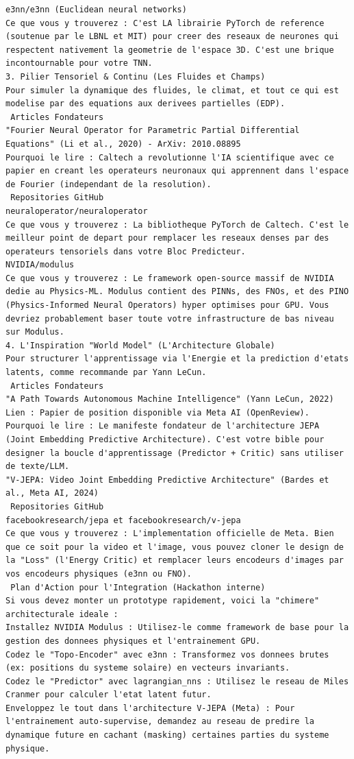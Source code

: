 \documentclass[11pt,a4paper]{article}
\begin{document}
\begin{lstlisting}[language={}, caption={}, basicstyle=\ttfamily\footnotesize, breaklines=true]
e3nn/e3nn (Euclidean neural networks)
Ce que vous y trouverez : C'est LA librairie PyTorch de reference (soutenue par le LBNL et MIT) pour creer des reseaux de neurones qui respectent nativement la geometrie de l'espace 3D. C'est une brique incontournable pour votre TNN.
3. Pilier Tensoriel & Continu (Les Fluides et Champs)
Pour simuler la dynamique des fluides, le climat, et tout ce qui est modelise par des equations aux derivees partielles (EDP).
 Articles Fondateurs
"Fourier Neural Operator for Parametric Partial Differential Equations" (Li et al., 2020) - ArXiv: 2010.08895
Pourquoi le lire : Caltech a revolutionne l'IA scientifique avec ce papier en creant les operateurs neuronaux qui apprennent dans l'espace de Fourier (independant de la resolution).
 Repositories GitHub
neuraloperator/neuraloperator
Ce que vous y trouverez : La bibliotheque PyTorch de Caltech. C'est le meilleur point de depart pour remplacer les reseaux denses par des operateurs tensoriels dans votre Bloc Predicteur.
NVIDIA/modulus
Ce que vous y trouverez : Le framework open-source massif de NVIDIA dedie au Physics-ML. Modulus contient des PINNs, des FNOs, et des PINO (Physics-Informed Neural Operators) hyper optimises pour GPU. Vous devriez probablement baser toute votre infrastructure de bas niveau sur Modulus.
4. L'Inspiration "World Model" (L'Architecture Globale)
Pour structurer l'apprentissage via l'Energie et la prediction d'etats latents, comme recommande par Yann LeCun.
 Articles Fondateurs
"A Path Towards Autonomous Machine Intelligence" (Yann LeCun, 2022)
Lien : Papier de position disponible via Meta AI (OpenReview).
Pourquoi le lire : Le manifeste fondateur de l'architecture JEPA (Joint Embedding Predictive Architecture). C'est votre bible pour designer la boucle d'apprentissage (Predictor + Critic) sans utiliser de texte/LLM.
"V-JEPA: Video Joint Embedding Predictive Architecture" (Bardes et al., Meta AI, 2024)
 Repositories GitHub
facebookresearch/jepa et facebookresearch/v-jepa
Ce que vous y trouverez : L'implementation officielle de Meta. Bien que ce soit pour la video et l'image, vous pouvez cloner le design de la "Loss" (l'Energy Critic) et remplacer leurs encodeurs d'images par vos encodeurs physiques (e3nn ou FNO).
 Plan d'Action pour l'Integration (Hackathon interne)
Si vous devez monter un prototype rapidement, voici la "chimere" architecturale ideale :
Installez NVIDIA Modulus : Utilisez-le comme framework de base pour la gestion des donnees physiques et l'entrainement GPU.
Codez le "Topo-Encoder" avec e3nn : Transformez vos donnees brutes (ex: positions du systeme solaire) en vecteurs invariants.
Codez le "Predictor" avec lagrangian_nns : Utilisez le reseau de Miles Cranmer pour calculer l'etat latent futur.
Enveloppez le tout dans l'architecture V-JEPA (Meta) : Pour l'entrainement auto-supervise, demandez au reseau de predire la dynamique future en cachant (masking) certaines parties du systeme physique.

\end{lstlisting}
\end{document}
